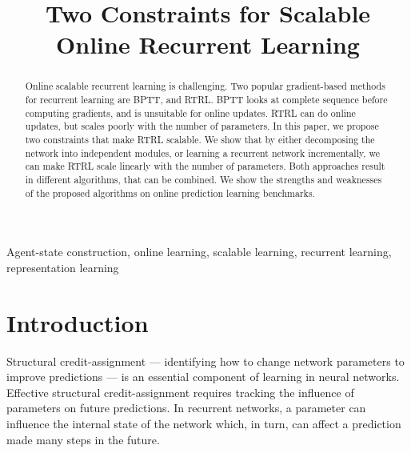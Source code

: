 \documentclass[twoside,11pt]{article}
\begin{document}
\title{Two Constraints for Scalable Online Recurrent Learning}

%

\maketitle

\begin{abstract}%
Online scalable recurrent learning is challenging. Two popular gradient-based methods for recurrent learning are BPTT, and RTRL. BPTT looks at complete sequence before computing gradients, and is unsuitable for online updates. RTRL can do online updates, but scales poorly with the number of parameters. In this paper, we propose two constraints that make RTRL scalable. We show that by either decomposing the network into independent modules, or learning a recurrent network incrementally, we can make RTRL scale linearly with the number of parameters. Both approaches result in different algorithms, that can be combined. We show the strengths and weaknesses of the proposed algorithms on online prediction learning benchmarks. 
\end{abstract}

\begin{keywords}
 Agent-state construction, online learning, scalable learning, recurrent learning, representation learning
\end{keywords}

\section{Introduction}

Structural credit-assignment --- identifying how to change network parameters to improve predictions --- is an essential component of learning in neural networks. Effective structural credit-assignment requires tracking the influence of parameters on future predictions. In recurrent networks, a parameter can influence the internal state of the network which, in turn, can affect a prediction made many steps in the future.
\end{document}
